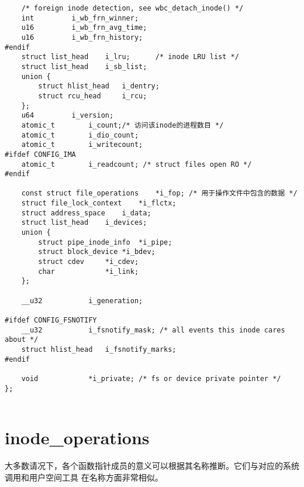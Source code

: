 \begin{lstlisting}
	/* foreign inode detection, see wbc_detach_inode() */
	int			i_wb_frn_winner;
	u16			i_wb_frn_avg_time;
	u16			i_wb_frn_history;
#endif
	struct list_head	i_lru;		/* inode LRU list */
	struct list_head	i_sb_list;
	union {
		struct hlist_head	i_dentry;
		struct rcu_head		i_rcu;
	};
	u64			i_version;
	atomic_t		i_count;/* 访问该inode的进程数目 */
	atomic_t		i_dio_count;
	atomic_t		i_writecount;
#ifdef CONFIG_IMA
	atomic_t		i_readcount; /* struct files open RO */
#endif

	const struct file_operations	*i_fop;	/* 用于操作文件中包含的数据 */
	struct file_lock_context	*i_flctx;
	struct address_space	i_data;
	struct list_head	i_devices;
	union {
		struct pipe_inode_info	*i_pipe;
		struct block_device	*i_bdev;
		struct cdev		*i_cdev;
		char			*i_link;
	};

	__u32			i_generation;

#ifdef CONFIG_FSNOTIFY
	__u32			i_fsnotify_mask; /* all events this inode cares about */
	struct hlist_head	i_fsnotify_marks;
#endif

	void			*i_private; /* fs or device private pointer */
};


\end{lstlisting}


\section{inode\_operations}

大多数请况下，各个函数指针成员的意义可以根据其名称推断。它们与对应的系统调用和用户空间工具
在名称方面非常相似。

